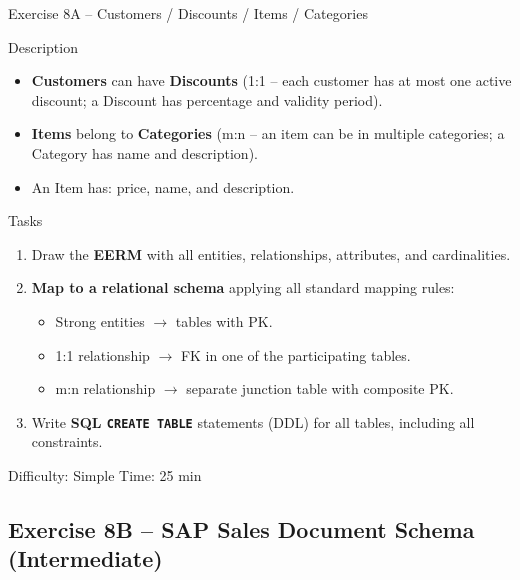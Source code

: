 \documentclass[10pt]{beamer}
\begin{document}
\begin{frame}{Exercise 8A -- Customers / Discounts / Items / Categories}
  \begin{block}{Description}
    \begin{itemize}
      \item \textbf{Customers} can have \textbf{Discounts} (1:1 -- each customer has at most one active discount; a Discount has percentage and validity period).
      \item \textbf{Items} belong to \textbf{Categories} (m:n -- an item can be in multiple categories; a Category has name and description).
      \item An Item has: price, name, and description.
    \end{itemize}
  \end{block}

  \begin{block}{Tasks}
    \begin{enumerate}
      \item Draw the \textbf{EERM} with all entities, relationships, attributes, and cardinalities.
      \item \textbf{Map to a relational schema} applying all standard mapping rules:
        \begin{itemize}
          \item Strong entities $\to$ tables with PK.
          \item 1:1 relationship $\to$ FK in one of the participating tables.
          \item m:n relationship $\to$ separate junction table with composite PK.
        \end{itemize}
      \item Write \textbf{SQL \texttt{CREATE TABLE}} statements (DDL) for all tables, including all constraints.
    \end{enumerate}
  \end{block}

  \begin{alertblock}{Difficulty: Simple \quad Time: 25 min}
  \end{alertblock}
\end{frame}

\subsection{Exercise 8B -- SAP Sales Document Schema (Intermediate)}
\end{document}
